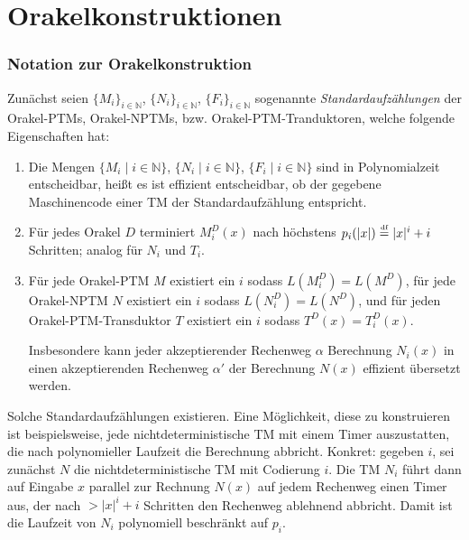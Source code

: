 \chapter{Orakelkonstruktionen}\label{chap:orakel}


\subsection*{Notation zur Orakelkonstruktion}

Zunächst seien $\{M_i\}_{i\in \mathbb N}$, $\{N_i\}_{i\in \mathbb N}$, $\{F_i\}_{i\in\mathbb N}$ sogenannte \emph{Standardaufzählungen} der Orakel-PTMs, Orakel-NPTMs, bzw. Orakel-PTM-Tranduktoren, welche folgende Eigenschaften hat:
\begin{enumerate}[label=\arabic*.,nosep]
    \item Die Mengen $\{M_i \mid i\in\mathbb N\}$, $\{N_i \mid i\in\mathbb N\}$, $\{F_i \mid i\in\mathbb N\}$ sind in Polynomialzeit entscheidbar, heißt es ist effizient entscheidbar, ob der gegebene Maschinencode einer TM der Standardaufzählung entspricht.
    \item Für jedes Orakel $D$ terminiert $M_i^D(x)$ nach höchstens $p_i(|x|)\stackrel{\text{\smash{\tiny df}}}{=} |x|^i+i$ Schritten; analog für $N_i$ und $T_i$.
    \item Für jede Orakel-PTM $M$ existiert ein $i$ sodass $L(M^D_i)=L(M^D)$, 
        für jede Orakel-NPTM $N$ existiert ein $i$ sodass $L(N^D_i)=L(N^D)$, und
        für jeden Orakel-PTM-Transduktor $T$ existiert ein $i$ sodass $T^D(x)=T_i^D(x)$.

        Insbesondere kann jeder akzeptierender Rechenweg $\alpha$ Berechnung $N_i(x)$ in einen akzeptierenden Rechenweg $\alpha'$ der Berechnung $N(x)$ effizient übersetzt werden.
\end{enumerate}
Solche Standardaufzählungen existieren. Eine Möglichkeit, diese zu konstruieren ist beispielsweise, jede nichtdeterministische TM mit einem Timer auszustatten, die nach polynomieller Laufzeit die Berechnung abbricht. Konkret: gegeben $i$, sei zunächst $N$ die nichtdeterministische TM mit Codierung $i$. Die TM $N_i$ führt dann auf Eingabe $x$ parallel zur Rechnung $N(x)$ auf jedem Rechenweg einen Timer aus, der nach $>|x|^i+i$ Schritten den Rechenweg ablehnend abbricht.
Damit ist die Laufzeit von $N_i$ polynomiell beschränkt auf $p_i$.

